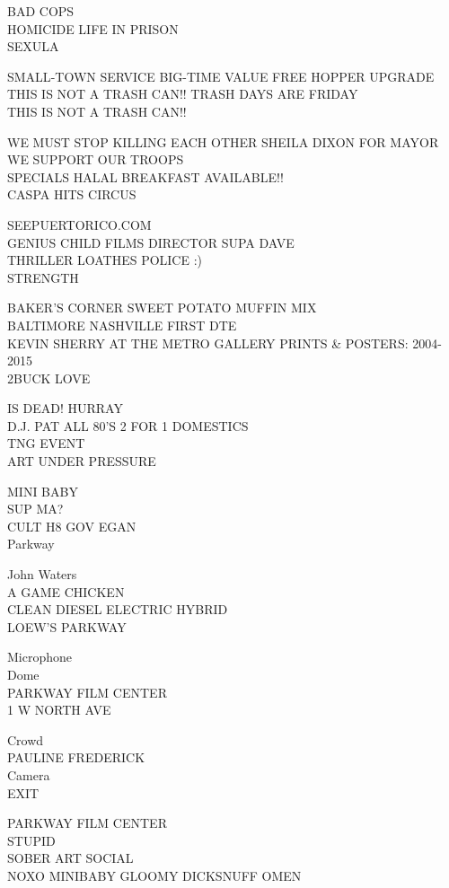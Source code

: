 \documentclass[10pt,letterpaper]{article}
\begin{document}
BAD COPS\\
HOMICIDE LIFE IN PRISON\\
SEXULA

SMALL{-}TOWN SERVICE BIG{-}TIME VALUE FREE HOPPER UPGRADE\\
THIS IS NOT A TRASH CAN!!  TRASH DAYS ARE FRIDAY\\
THIS IS NOT A TRASH CAN!!

WE MUST STOP KILLING EACH OTHER SHEILA DIXON FOR MAYOR\\
WE SUPPORT OUR TROOPS\\
SPECIALS HALAL BREAKFAST AVAILABLE!!\\
CASPA HITS CIRCUS

SEEPUERTORICO.COM\\
GENIUS CHILD FILMS DIRECTOR SUPA DAVE\\
THRILLER LOATHES POLICE :)\\
STRENGTH

BAKER'S CORNER SWEET POTATO MUFFIN MIX\\
BALTIMORE NASHVILLE FIRST DTE\\
KEVIN SHERRY AT THE METRO GALLERY PRINTS \& POSTERS: 2004{-}2015\\
2BUCK LOVE

IS DEAD! HURRAY\\
D.J. PAT ALL 80'S 2 FOR 1 DOMESTICS\\
TNG EVENT\\
ART UNDER PRESSURE

MINI BABY\\
SUP MA?\\
CULT H8 GOV EGAN\\
Parkway

John Waters\\
A GAME CHICKEN\\
CLEAN DIESEL ELECTRIC HYBRID\\
LOEW'S PARKWAY

Microphone\\
Dome\\
PARKWAY FILM CENTER\\
1 W NORTH AVE

Crowd\\
PAULINE FREDERICK\\
Camera\\
EXIT

PARKWAY FILM CENTER\\
STUPID\\
SOBER ART SOCIAL\\
NOXO MINIBABY GLOOMY DICKSNUFF OMEN
\end{document}

